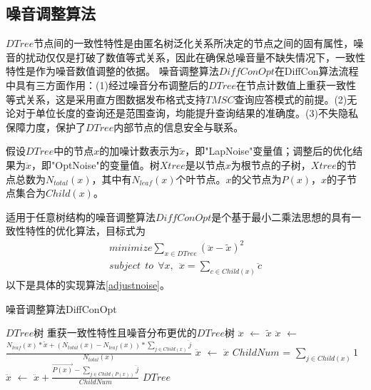 




\subsection{噪音调整算法}

$DTree$节点间的一致性特性是由匿名树泛化关系所决定的节点之间的固有属性，噪音的扰动仅仅是打破了数值等式关系，因此在确保总噪音量不缺失情况下，一致性特性是作为噪音数值调整的依据。
噪音调整算法$DiffConOpt$在DiffCon算法流程中具有三方面作用：(1)经过噪音分布调整后的$DTree$在节点计数值上重获一致性等式关系，这是采用直方图数据发布格式支持$TMSC$查询应答模式的前提。(2)无论对于单位长度的查询还是范围查询，均能提升查询结果的准确度。(3)不失隐私保障力度，保护了$DTree$内部节点的信息安全与联系。

假设$DTree$中的节点$x$的加噪计数表示为$\tilde{x}$，即"LapNoise"变量值；调整后的优化结果为$\ddot{x}$，即"OptNoise"的变量值。树$Xtree$是以节点$x$为根节点的子树，$Xtree$的节点总数为$N_{total}(x)$，其中有$N_{leaf}(x)$个叶节点。$x$的父节点为$P(x)$，$x$的子节点集合为$Child(x)$。

适用于任意树结构的噪音调整算法$DiffConOpt$是个基于最小二乘法思想的具有一致性特性的优化算法，目标式为
\begin{equation}
\label{equa_mini}
\begin{split}
minimize \sum\limits_{x \in DTree} (\ddot{x} - \tilde{x})^2 \\
subject\ \ to\ \ \forall x,\ \ \ddot{x} = \sum\limits_{c \in Child(x)} \ddot{c} 
\end{split}
\end{equation}
以下是具体的实现算法\ref{adjustnoise}。

\begin{algorithm}[H]
	\caption{噪音调整算法DiffConOpt} 
	\label{adjustnoise}
	\begin{algorithmic}[1]
		\REQUIRE $DTree$树
		\ENSURE 重获一致性特性且噪音分布更优的$DTree$树
		\STATE $\ddot{x}$ $\leftarrow$ $\tilde{x}$ 
		\ELSE
		\STATE  $\ddot{x}$ $\leftarrow$ $\frac{{N_{leaf}(x) * \tilde{x} + (N_{total}(x) - N_{leaf}(x)) * \sum\nolimits_{j \in Child(x)} {\ddot{j}}}}{{N_{total}(x)}}$
		\ENDIF
		\ENDFOR
		\STATE  $\ddot{x}$ $\leftarrow$ $\ddot{x}$
		\ELSE
		\STATE  $ChildNum$ = ${\sum\nolimits_{j \in Child(x)} {1}}$
		\STATE  $\ddot{x}$ $\leftarrow$ $\ddot{x} + \frac{{\overrightarrow{P(x)} - \sum\nolimits_{j \in Child(P(x))} {\ddot{j}}}}{ChildNum}$
		\ENDIF
		\ENDFOR
		\RETURN $DTree$
	\end{algorithmic}
\end{algorithm}

